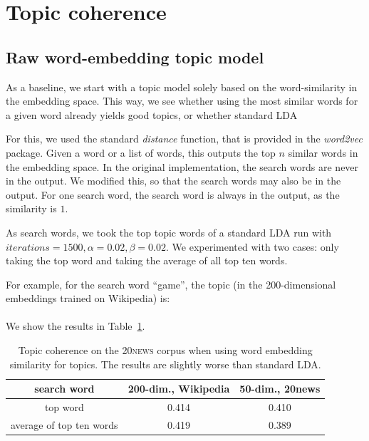 \documentclass[
        a4paper,
        titlepage,
        twoside,
        parskip
        ]{scrbook}
\theoremstyle{break}
\begin{document}
\section{Topic coherence}
\subsection{Raw word-embedding topic model}
As a baseline, we start with a topic model solely based on the word-similarity in the embedding space.
This way, we see whether using the most similar words for a given word already yields good topics, or whether standard LDA

For this, we used the standard \emph{distance} function, that is provided in the \emph{word2vec} package.
Given a word or a list of words, this outputs the top $n$ similar words in the embedding space.
In the original implementation, the search words are never in the output.
We modified this, so that the search words may also be in the output.
For one search word, the search word is always in the output, as the similarity is $1$.

As search words, we took the top topic words of a standard LDA run with $iterations=1500, \alpha=0.02, \beta=0.02$.
We experimented with two cases: only taking the top word and taking the average of all top ten words.

For example, for the search word ``game'', the topic (in the 200-dimensional embeddings trained on Wikipedia) is: \\
\hspace*{0cm}  \\

We show the results in Table~\ref{table:raw_we_tm}.
\begin{table}[]
  \centering
  \caption{Topic coherence on the \textsc{20news} corpus when using word embedding similarity for topics. The results are slightly worse than standard LDA.}
  \label{table:raw_we_tm}
  \begin{tabular}{ccc}
    \textbf{search word}     & \textbf{200-dim., Wikipedia} & \textbf{50-dim., 20news} \\
    \hline
    top word                 & 0.414                        & 0.410                    \\
    average of top ten words & 0.419                        & 0.389
  \end{tabular}
\end{table}
\end{document}
